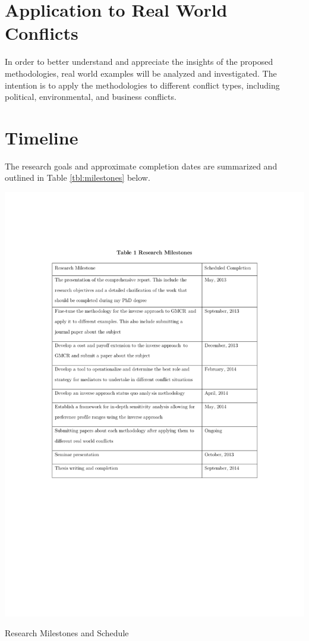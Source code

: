 \documentclass[letterpaper,12pt,titlepage,oneside,final]{book}
\begin{document}
\section{Application to Real World Conflicts}
In order to better understand and appreciate the insights of the proposed methodologies, real world examples will be analyzed and investigated. The intention is to apply the methodologies to different conflict types, including political, environmental, and business conflicts.
\section{Timeline}
The research goals and approximate completion dates are summarized and outlined in Table \ref{tbl:milestones} below.
\begin{table}[H]
\centering
\includegraphics[scale=.8]{PDF-IMG/Research_Milestones.pdf}

\caption{Research Milestones and Schedule}

\label{tbl:milestones}
\end{table}
\end{document}
